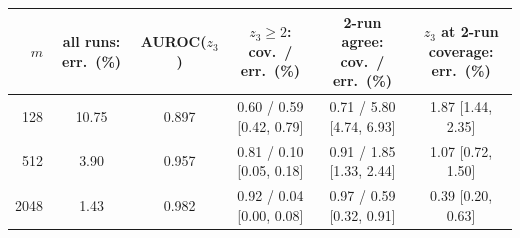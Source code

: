 \begin{tabular}{rccccc}
\toprule
$m$ & all runs: err.\ (\%) & AUROC($z_3$) & $z_3\ge2$: cov.\ / err.\ (\%) & 2-run agree: cov.\ / err.\ (\%) & $z_3$ at 2-run coverage: err.\ (\%)\\
\midrule
128 & 10.75 & 0.897 & 0.60 / 0.59 [0.42, 0.79] & 0.71 / 5.80 [4.74, 6.93] & 1.87 [1.44, 2.35]\\
512 & 3.90 & 0.957 & 0.81 / 0.10 [0.05, 0.18] & 0.91 / 1.85 [1.33, 2.44] & 1.07 [0.72, 1.50]\\
2048 & 1.43 & 0.982 & 0.92 / 0.04 [0.00, 0.08] & 0.97 / 0.59 [0.32, 0.91] & 0.39 [0.20, 0.63]\\
\bottomrule
\end{tabular}